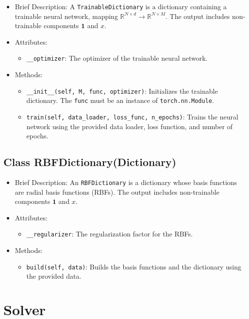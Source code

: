 \begin{itemize}
\item Brief Description: A \lstinline|TrainableDictionary|
  is a dictionary containing a trainable neural network,
  mapping $\mathbb{R}^{N \times d} \rightarrow \mathbb{R}^{N \times M}$.
  The output includes non-trainable components $\mathbf{1}$ and $x$.
\item Attributes:
  \begin{itemize}
  \item \lstinline|__optimizer|: The optimizer of the trainable neural network.
  \end{itemize}
\item Methods:
  \begin{itemize}
  \item \lstinline|__init__(self, M, func, optimizer)|:
  Initializes the trainable dictionary.
  The \lstinline|func| must be an instance of \lstinline|torch.nn.Module|.
  \item \lstinline|train(self, data_loader, loss_func, n_epochs)|:
  Trains the neural network using the provided data loader, loss function,
  and number of epochs.
  \end{itemize}
\end{itemize}

\subsection{Class RBFDictionary(Dictionary)}

\begin{itemize}
\item Brief Description:
  An \lstinline|RBFDictionary| is a dictionary
  whose basis functions are radial basis functions (RBFs).
  The output includes non-trainable components $\mathbf{1}$ and $x$.
\item Attributes:
  \begin{itemize}
  \item \lstinline|__regularizer|: The regularization factor for the RBFs.
  \end{itemize}
\item Methods:
  \begin{itemize}
  \item \lstinline|build(self, data)|: Builds the basis functions and the dictionary
  using the provided data.
  \end{itemize}
\end{itemize}

\section{Solver}

